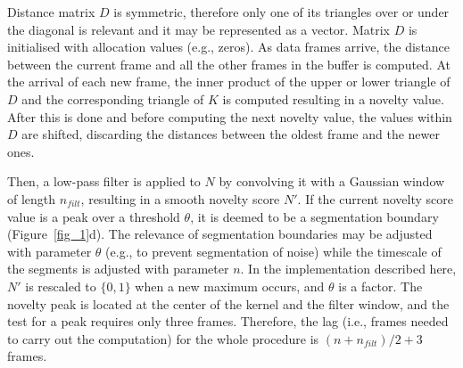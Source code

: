 \documentclass{nime-alternate_MANUSCRIPT} %
\begin{document}
Distance matrix $D$ is symmetric, therefore only one of its triangles over or under the diagonal is relevant and it may be represented as a vector. Matrix $D$ is initialised with allocation values (e.g., zeros). As data frames arrive, the  distance between the current frame and all the other frames in the buffer is computed. At the arrival of each new frame, the inner product of the upper or lower triangle of $D$ and the corresponding triangle of $K$ is computed resulting in a novelty value. After this is done and before computing the next novelty value, the values within $D$ are shifted, discarding the distances between the oldest frame and the newer ones.

Then, a low-pass filter is applied to $N$ by convolving it with a Gaussian window of length $n_{filt}$, resulting in a smooth novelty score $N'$. If the current novelty score value is a peak over a threshold $\theta$, it is deemed to be a segmentation boundary (Figure~\ref{fig_1}d). The relevance of segmentation boundaries may be adjusted with parameter $\theta$ (e.g., to prevent segmentation of noise) while the timescale of the segments is adjusted with parameter $n$. In the implementation described here, $N'$ is rescaled to $\{0,1\}$ when a new maximum occurs, and $\theta$ is a factor. The novelty peak is located at the center of the kernel and the filter window, and the test for a peak requires only three frames. Therefore, the lag (i.e., frames needed to carry out the computation) for the whole procedure is $(n+ n_{filt})/2+3$ frames.
\end{document}
